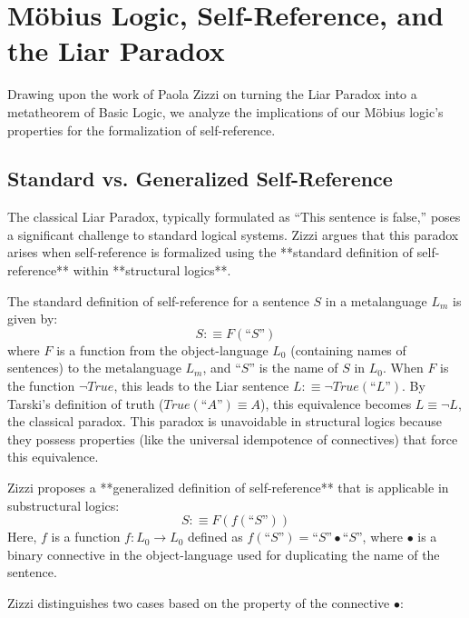 \documentclass{article}
\begin{document}
	\section{Möbius Logic, Self-Reference, and the Liar Paradox}
	
	Drawing upon the work of Paola Zizzi on turning the Liar Paradox into a metatheorem of Basic Logic, we analyze the implications of our M\"{o}bius logic's properties for the formalization of self-reference.
	
	\subsection{Standard vs. Generalized Self-Reference}
	
	The classical Liar Paradox, typically formulated as ``This sentence is false,'' poses a significant challenge to standard logical systems. Zizzi argues that this paradox arises when self-reference is formalized using the **standard definition of self-reference** within **structural logics**.
	
	The standard definition of self-reference for a sentence \(S\) in a metalanguage \(L_m\) is given by:
	\[ S :\equiv F(\text{``}S\text{''}) \]
	where \(F\) is a function from the object-language \(L_0\) (containing names of sentences) to the metalanguage \(L_m\), and \(\text{``}S\text{''}\) is the name of \(S\) in \(L_0\). When \(F\) is the function \(\neg True\), this leads to the Liar sentence \(L :\equiv \neg True(\text{``}L\text{''})\). By Tarski's definition of truth (\(True(\text{``}A\text{''}) \equiv A\)), this equivalence becomes \(L \equiv \neg L\), the classical paradox. This paradox is unavoidable in structural logics because they possess properties (like the universal idempotence of connectives) that force this equivalence.
	
	Zizzi proposes a **generalized definition of self-reference** that is applicable in substructural logics:
	\[ S :\equiv F(f(\text{``}S\text{''})) \]
	Here, \(f\) is a function \(f: L_0 \to L_0\) defined as \(f(\text{``}S\text{''}) = \text{``}S\text{''} \bullet \text{``}S\text{''}\), where \(\bullet\) is a binary connective in the object-language used for duplicating the name of the sentence.
	
	Zizzi distinguishes two cases based on the property of the connective \(\bullet\):
	
\end{document}
